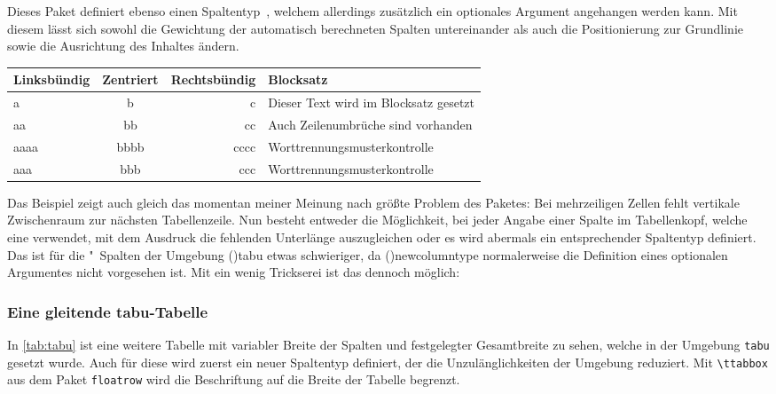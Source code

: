 \documentclass[%
  english,ngerman,%
  cdgeometry=no,DIV=12,%
  cd=false,cdfont=false,cdtitle=true,%
  headings=normal,%
  automark,%
  listof=toc,%
]{tudscrartcl}
\makeatletter
\newcommand*\pcolumnfuzz[1]{\pretocmd\@endpbox{\hfuzz=#1}{}{}}
\makeatother
\begin{document}
Dieses Paket definiert ebenso einen Spaltentyp~, welchem allerdings 
zusätzlich ein optionales Argument angehangen werden kann. Mit diesem lässt 
sich sowohl die Gewichtung der automatisch berechneten Spalten untereinander 
als auch die Positionierung zur Grundlinie sowie die Ausrichtung des Inhaltes 
ändern.
%
\begingroup
\pcolumnfuzz{70pt}
\begin{Hint*}
\begin{tabu} to 11.7cm {lcrX}
\toprule
\textbf{Linksbündig} & \textbf{Zentriert} & 
\textbf{Rechtsbündig} & \textbf{Blocksatz} \tabularnewline\midrule
a    & b    & c    & Dieser Text wird im Blocksatz gesetzt\tabularnewline
aa   & bb   & cc   & Auch Zeilenumbrüche sind vorhanden\tabularnewline
aaaa & bbbb & cccc & Worttrennungsmus\-terkontrolle\tabularnewline
aaa  & bbb  & ccc  & Worttrennungsmusterkontrolle
\tabularnewline\bottomrule
\end{tabu}
\end{Hint*}
\endgroup
%
Das Beispiel zeigt auch gleich das momentan meiner Meinung nach größte Problem 
des Paketes: Bei mehrzeiligen Zellen fehlt vertikale Zwischenraum zur nächsten 
Tabellenzeile. Nun besteht entweder die Möglichkeit, bei jeder Angabe einer 
Spalte im Tabellenkopf, welche eine  verwendet, mit dem Ausdruck 
 die fehlenden Unterlänge auszugleichen 
oder es wird abermals ein entsprechender Spaltentyp definiert. Das ist für 
die "~Spalten der Umgebung \Environment(){tabu} etwas 
schwieriger, da \Macro(){newcolumntype} normalerweise die 
Definition eines optionalen Argumentes nicht vorgesehen ist. Mit ein wenig 
Trickserei ist das dennoch möglich:
%
\begin{Trunk+}
\subsubsection{Eine gleitende tabu-Tabelle}

In \autoref{tab:tabu} ist eine weitere Tabelle mit variabler Breite der 
Spalten und festgelegter Gesamtbreite zu sehen, welche in der Umgebung 
\texttt{tabu} gesetzt wurde. Auch für diese wird zuerst ein neuer 
Spaltentyp definiert, der die Unzulänglichkeiten der Umgebung reduziert. 
Mit \texttt{\textbackslash ttabbox} aus dem Paket \texttt{floatrow} wird 
die Beschriftung auf die Breite der Tabelle begrenzt.

\end{Trunk+}
\CodeHook{\renewcommand*{\newcolumntype}[2]{}}
\begin{Trunk*}
\makeatletter
\newcolumntype{Z}{}
\renewcommand*{\NC@rewrite@Z}[1][]{%
  \NC@find>{\hspace{0pt}}X[#1]<{\@finalstrut\@arstrutbox}%
}
\makeatother

\end{Trunk*}
\end{document}
